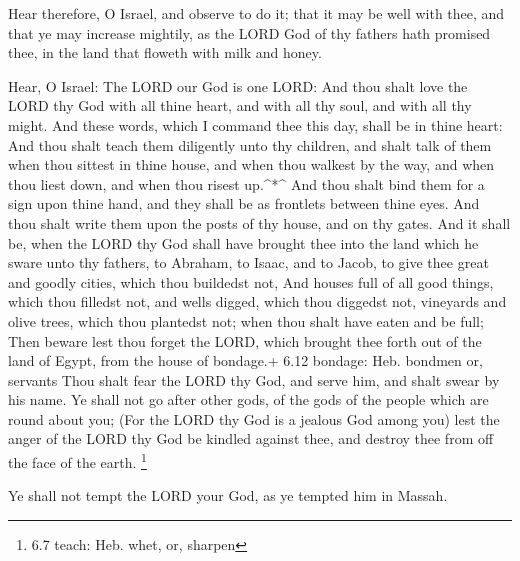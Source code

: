  Hear therefore, O Israel, and observe to do it; that it may
be well with thee, and that ye may increase mightily, as the LORD God of
thy fathers hath promised thee, in the land that floweth with milk and
honey.

 Hear, O Israel: The LORD our God is one LORD: 
And thou shalt love the LORD thy God with all thine heart, and with all
thy soul, and with all thy might.  And these words, which I
command thee this day, shall be in thine heart:  And thou
shalt teach them diligently unto thy children, and shalt talk of them
when thou sittest in thine house, and when thou walkest by the way, and
when thou liest down, and when thou risest up.\^{}*\^{}  And
thou shalt bind them for a sign upon thine hand, and they shall be as
frontlets between thine eyes.  And thou shalt write them
upon the posts of thy house, and on thy gates.  And it
shall be, when the LORD thy God shall have brought thee into the land
which he sware unto thy fathers, to Abraham, to Isaac, and to Jacob, to
give thee great and goodly cities, which thou buildedst not,
 And houses full of all good things, which thou filledst
not, and wells digged, which thou diggedst not, vineyards and olive
trees, which thou plantedst not; when thou shalt have eaten and be full;
 Then beware lest thou forget the LORD, which brought thee
forth out of the land of Egypt, from the house of bondage.+ 6.12
bondage: Heb. bondmen or, servants  Thou shalt fear the
LORD thy God, and serve him, and shalt swear by his name. 
Ye shall not go after other gods, of the gods of the people which are
round about you;  (For the LORD thy God is a jealous God
among you) lest the anger of the LORD thy God be kindled against thee,
and destroy thee from off the face of the earth. \footnote{6.7 teach:
  Heb. whet, or, sharpen}

 Ye shall not tempt the LORD your God, as ye tempted him in
Massah.

